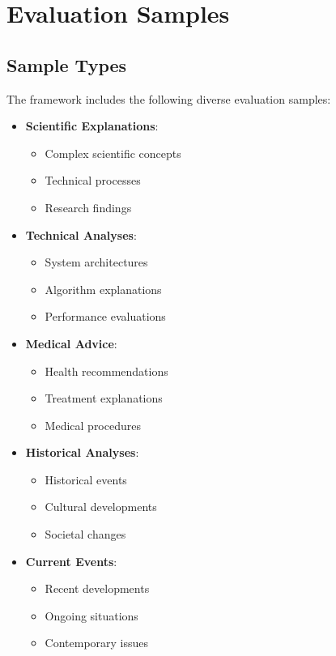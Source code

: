 \vspace{0.5em}
\section{Evaluation Samples}

\subsection{Sample Types}
The framework includes the following diverse evaluation samples:

\begin{itemize}
    \item \textbf{Scientific Explanations}:
    \begin{itemize}
        \item Complex scientific concepts
        \item Technical processes
        \item Research findings
    \end{itemize}
    \vspace{0.5em}
    \item \textbf{Technical Analyses}:
    \begin{itemize}
        \item System architectures
        \item Algorithm explanations
        \item Performance evaluations
    \end{itemize}
    \vspace{0.5em}
    \item \textbf{Medical Advice}:
    \begin{itemize}
        \item Health recommendations
        \item Treatment explanations
        \item Medical procedures
    \end{itemize}
    \vspace{0.5em}
    \item \textbf{Historical Analyses}:
    \begin{itemize}
        \item Historical events
        \item Cultural developments
        \item Societal changes
    \end{itemize}
    \vspace{0.5em}
    \item \textbf{Current Events}:
    \begin{itemize}
        \item Recent developments
        \item Ongoing situations
        \item Contemporary issues
    \end{itemize}
\end{itemize}

